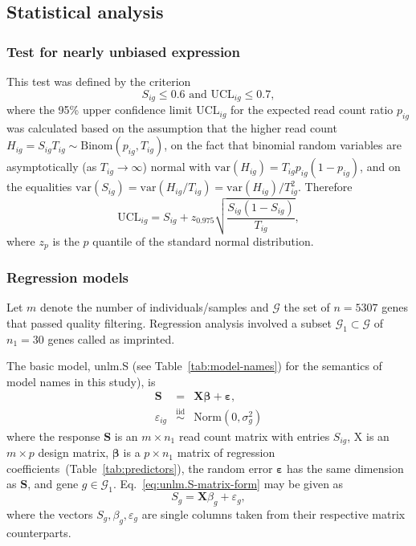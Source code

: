 \documentclass[12pt,letterpaper]{article}
\begin{document}
\subsection{Statistical analysis}

\subsubsection{Test for nearly unbiased expression}

This test was defined by the criterion
\begin{equation}
S_{ig} \le 0.6 \text{ and } \mathrm{UCL}_{ig} \le 0.7,
\label{eq:unbiased-test}
\end{equation}
where the 95\% upper confidence limit \(\mathrm{UCL}_{ig}\) for the expected
read count ratio \(p_{ig}\) was calculated based on the assumption
that the higher read count \(H_{ig}=S_{ig}T_{ig}\sim \mathrm{Binom}(p_{ig},
T_{ig})\), on the fact that binomial random variables are
asymptotically (as \(T_{ig}\rightarrow \infty\)) normal with
\(\mathrm{var}(H_{ig}) = T_{ig}p_{ig}(1-p_{ig})\), and on the equalities
\(\mathrm{var}(S_{ig}) = \mathrm{var}(H_{ig}/T_{ig}) =
\mathrm{var}(H_{ig})/T_{ig}^2\).  Therefore
\begin{equation}
\mathrm{UCL}_{ig} = S_{ig} + z_{0.975} \sqrt{\frac{S_{ig} (1 - S_{ig})}{T_{ig}}},
\end{equation}
where $z_{p}$ is the $p$ quantile of the standard normal distribution.

\subsubsection{Regression models}
\label{sec:methods-regression}

Let \(m\) denote the number of individuals/samples and \(\mathcal{G}\) the set
of \(n=5307\) genes that passed quality filtering.  Regression analysis
involved a subset \(\mathcal{G}_1\subset\mathcal{G}\) of \(n_1=30\) genes
called as imprinted.

The basic model, unlm.S (see Table~\ref{tab:model-names}) for the semantics of
model names in this study), is
\begin{eqnarray}
\mathbf{S} &=& \mathbf{X} \boldsymbol{\beta} + \boldsymbol{\varepsilon},
\label{eq:unlm.S-matrix-form} \\
\varepsilon_{ig} &\overset{\mathrm{iid}}{\sim}& \mathrm{Norm}(0, \sigma^2_g)
\end{eqnarray}
where the response \(\mathbf{S}\) is an \(m\times n_1\) read count matrix with
entries \(S_{ig}\), \(\mathrm{X}\) is an \(m\times p\) design matrix,
\(\boldsymbol{\beta}\) is a \(p\times n_1\) matrix of regression
coefficients~(Table~\ref{tab:predictors}), the random error
\(\boldsymbol{\varepsilon}\) has the same dimension as \(\mathbf{S}\), and
gene \(g\in \mathcal{G}_1\).  Eq.~\ref{eq:unlm.S-matrix-form} may be given as
\begin{equation}
S_g = \mathbf{X} \beta_g + \varepsilon_g,
\label{eq:unlm.S-vector-form}
\end{equation}
where the vectors \(S_g, \beta_g, \varepsilon_g\)
are single columns taken from their respective matrix counterparts.
\end{document}
